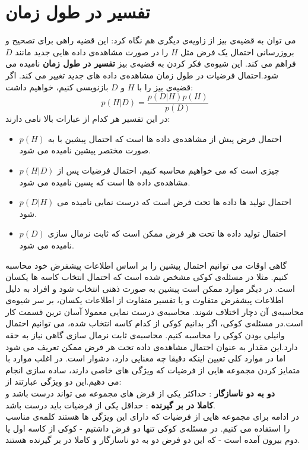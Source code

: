 \section{تفسیر در طول زمان}
می توان به قضیه‌ی بیز از زاویه‌ی دیگری هم نگاه کرد: این قضیه راهی برای تصحیح و بروزرسانی احتمال یک فرض مثل $H$ را در صورت مشاهده‌ی داده هایی جدید مانند $D$ فراهم می کند. این شیوه‌ی فکر کردن به قضیه‌ی بیز \textbf{تفسیر در طول زمان} نامیده می شود.احتمال فرضیات در طول زمان مشاهده‌ی داده های جدید تغییر می کند.
اگر قضیه‌ی بیز را با $H$ و $D$ بازنویسی کنیم، خواهیم داشت:
$$ p(H|D) = \frac{p(D|H)p(H)}{p(D)} $$
در این تفسیر هر کدام از عبارات بالا نامی دارند:
\begin{itemize}
\item $p(H)$ احتمال فرض پیش از مشاهده‌ی داده ها است که احتمال پیشین با به صورت مختصر پیشین نامیده می شود.
\item $p(H|D)$ چیزی است که می خواهیم محاسبه کنیم، احتمال فرضیات پس از مشاهده‌ی داده ها است که پسین نامیده می شود.
\item $p(D|H)$ احتمال تولید ها داده ها تحت فرض است که درست نمایی نامیده می شود.
\item $p(D)$ احتمال تولید داده ها تحت هر فرض ممکن است که ثابت نرمال سازی  نامیده می شود.
\end{itemize}
گاهی اوقات می توانیم احتمال پیشین را بر اساس اطلاعات پیشفرض خود محاسبه کنیم. مثلا در مسئله‌ی کوکی مشخص شده است که احتمال انتخاب کاسه ها یکسان است. در دیگر موارد ممکن است پیشین به صورت ذهنی انتخاب شود و افراد به دلیل اطلاعات پیشفرض متفاوت و یا تفسیر متفاوت از اطلاعات یکسان، بر سر شیوه‌ی محاسبه‌ی آن دچار اختلاف شوند.
محاسبه‌ی درست نمایی معمولا آسان ترین قسمت کار است.در مسئله‌ی کوکی، اگر بدانیم کوکی از کدام کاسه انتخاب شده، می توانیم احتمال وانیلی بودن کوکی را محاسبه کنیم.
محاسبه‌ی ثابت نرمال سازی گاهی نیاز به حقه دارد.این مقدار به عنوان احتمال مشاهده‌ی داده تحت هر فرض ممکن تعریف می شود اما در موارد کلی تعیین اینکه دقیقا چه معنایی دارد، دشوار است. در اغلب موارد با متمایز کردن مجموعه هایی از فرضیات که ویژگی های خاصی دارند، ساده سازی انجام می دهیم.این دو ویژگی عبارتند از:\\
\textbf{دو به دو ناسازگار} : حداکثر یکی از فرض های مجموعه می تواند درست باشد و\\
\textbf{کاملا در بر گیرنده} : حداقل یکی از فرضیات باید درست باشد.\\
در ادامه برای مجموعه هایی از فرضیات که دارای این ویژگی ها هستند کلمه‌ی مناسب را استفاده می کنیم. در مسئله‌ی کوکی تنها دو فرض داشتیم - کوکی از کاسه اول یا دوم بیرون آمده است - که این دو فرض دو به دو ناسازگار و کاملا در بر گیرنده هستند.
